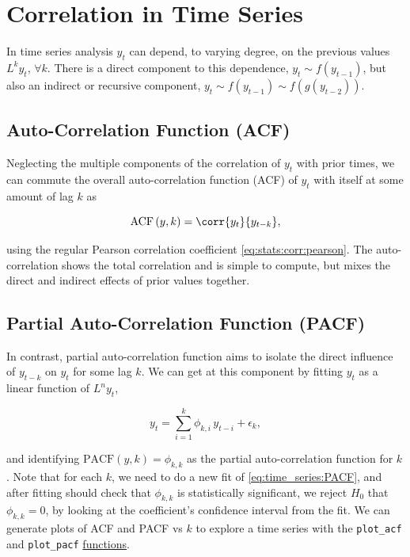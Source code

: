\section{Correlation in Time Series}
\label{time_series:correlation}

In time series analysis $y_{t}$ can depend, to varying degree,
on the previous values $L^{k} y_{t},\, \forall k$.
There is a direct component to this dependence,
$y_{t} \sim f\left(y_{t-1}\right)$,
but also an indirect or recursive component,
$y_{t} \sim f\left(y_{t-1}\right) \sim f\left(g\left(y_{t-2}\right)\right)$.

\subsection{Auto-Correlation Function (ACF)}
\label{time_series:ACF}

Neglecting the multiple components of the correlation of $y_{t}$ with prior times,
we can commute the overall auto-correlation function (ACF) of $y_{t}$
with itself at some amount of lag $k$ as

\begin{equation}\label{eq:time_series:ACF}
\text{ACF}\left(y,k\right) = \corr{y_{t}}{y_{t-k}},
\end{equation}

\noindent using the regular Pearson correlation coefficient \cref{eq:stats:corr:pearson}.
The auto-correlation shows the total correlation and is simple to compute,
but mixes the direct and indirect effects of prior values together.

\subsection{Partial Auto-Correlation Function (PACF)}
\label{time_series:PACF}

In contrast, partial auto-correlation function
aims to isolate the direct influence of $y_{t-k}$ on $y_{t}$ for some lag $k$.
We can get at this component by fitting $y_{t}$ as a linear function of $L^{n} y_{t}$,

\begin{equation}\label{eq:time_series:PACF}
y_{t} = \sum_{i=1}^{k} \phi_{k,i}\, y_{t-i} + \epsilon_{k},
\end{equation}

\noindent and identifying $\text{PACF}\left(y,k\right) = \phi_{k,k}$
as the partial auto-correlation function for $k$.
Note that for each $k$, we need to do a new fit of \cref{eq:time_series:PACF},
and after fitting should check that $\phi_{k,k}$ is statistically significant,
\ie we reject $H_{0}$ that $\phi_{k,k}=0$, by looking at the coefficient's confidence interval from the fit.
We can generate plots of ACF and PACF vs $k$ to explore a time series
with the \texttt{plot\_acf} and \texttt{plot\_pacf}
\href{https://www.statsmodels.org/stable/graphics.html\#time-series-plots}{functions}.

